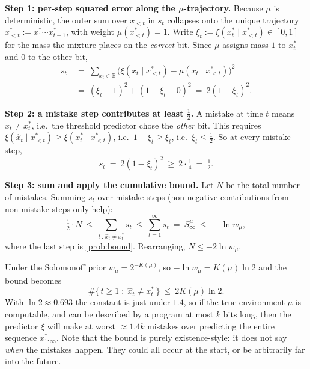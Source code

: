 \documentclass[fontsize=11pt, parskip=half]{scrartcl}
\begin{document}
\begin{solution}
\textbf{Step 1: per-step squared error along the $\mu$-trajectory.}
Because $\mu$ is deterministic, the outer sum over $x_{<t}$ in $s_t$ collapses
onto the unique trajectory $x_{<t}^* := x_1^* \cdots x_{t-1}^*$, with weight
$\mu(x_{<t}^*) = 1$. Write $\xi_t := \xi(x_t^* \mid x_{<t}^*) \in [0,1]$ for the
mass the mixture places on the \emph{correct} bit. Since $\mu$ assigns mass $1$
to $x_t^*$ and $0$ to the other bit,
\begin{align*}
  s_t ~&=~ \sum_{x_t \in \mathbb{B}} \big(\xi(x_t \mid x_{<t}^*) - \mu(x_t \mid x_{<t}^*)\big)^2 \\
  ~&=~ (\xi_t - 1)^2 + (1 - \xi_t - 0)^2 ~=~ 2(1 - \xi_t)^2.
\end{align*}

\textbf{Step 2: a mistake step contributes at least $\tfrac12$.}
A mistake at time $t$ means $\hat{x}_t \neq x_t^*$, i.e.\ the threshold predictor
chose the \emph{other} bit. This requires
$\xi(\hat{x}_t \mid x_{<t}^*) \geq \xi(x_t^* \mid x_{<t}^*)$, i.e.\
$1 - \xi_t \geq \xi_t$, i.e.\ $\xi_t \leq \tfrac12$. So at every mistake step,
\[
  s_t ~=~ 2(1 - \xi_t)^2 ~\geq~ 2 \cdot \tfrac{1}{4} ~=~ \tfrac12.
\]

\textbf{Step 3: sum and apply the cumulative bound.}
Let $N$ be the total number of mistakes. Summing $s_t$ over mistake steps
(non-negative contributions from non-mistake steps only help):
\[
  \tfrac12 \cdot N
  ~\leq~ \sum_{t \,:\, \hat{x}_t \neq x_t^*} s_t
  ~\leq~ \sum_{t=1}^\infty s_t ~=~ S^\mu_\infty
  ~\leq~ -\ln w_\mu,
\]
where the last step is \cref{prob:bound}. Rearranging, $N \leq -2 \ln w_\mu$.
\qedhere
\end{solution}

\begin{remark}
Under the Solomonoff prior $w_\mu = 2^{-K(\mu)}$, so $-\ln w_\mu = K(\mu)\ln 2$
and the bound becomes
\[
  \#\{\, t \geq 1 \;:\; \hat{x}_t \neq x_t^* \,\} ~\leq~ 2 K(\mu) \ln 2.
\]
With $\ln 2 \approx 0.693$ the constant is just under $1.4$, so if the true 
environment $\mu$ is computable, and can be described by a program at most $k$ bits long, 
then the predictor $\xi$ 
will make at worst $\approx 1.4 k$ mistakes over predicting the entire sequence $x^*_{1:\infty}$.
Note that the bound is purely existence-style: it does not say \emph{when}
the mistakes happen. They could all occur at the start, or be arbitrarily far into the future.
\end{remark}
\end{document}
